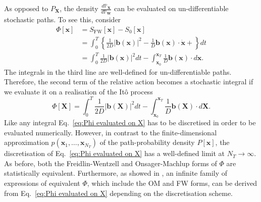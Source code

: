 As opposed to $P_\mathbf{X}$, the density $\frac{d \mathbb{P}_\mathbf{X}}{d \mathbb{P}_\mathbf{W}}$ can be evaluated on un-differentiable stochastic paths. To see this, consider
\begin{equation} \label{eq:Phi relative action}
\begin{aligned}
\Phi[\mathbf{x}] & = S_\text{FW}[\mathbf{x}] - S_0[\mathbf{x}] \\
& = \int_0^T \left\{ \frac{1}{2D} |\mathbf{b}(\mathbf{x})|^2 - \frac{1}{D} \mathbf{b}(\mathbf{x}) \cdot \dot{\mathbf{x}} +  \right\} dt \\
& = \int_0^T  \frac{1}{2D} |\mathbf{b}(\mathbf{x})|^2 dt - \int_{\mathbf{x}_0}^{\mathbf{x}_T} \frac{1}{D} \mathbf{b}(\mathbf{x}) \cdot d \mathbf{x}.
\end{aligned}
\end{equation}
The integrals in the third line are well-defined for un-differentiable paths. Therefore, the second term of the relative action becomes a stochastic integral if we evaluate it on a realisation of the It\^{o} process
\begin{equation} \label{eq:Phi evaluated on X}
\Phi[\mathbf{X}] = \int_0^T  \frac{1}{2D} |\mathbf{b}(\mathbf{X})|^2 dt - \int_{\mathbf{x}_0}^{\mathbf{x}_T} \frac{1}{D} \mathbf{b}(\mathbf{X}) \cdot d \mathbf{X}.
\end{equation}
Like any integral Eq.~\ref{eq:Phi evaluated on X} has to be discretised in order to be evaluated numerically. However, in contrast to the finite-dimensional approximation $p(\mathbf{x}_1, \dots, \mathbf{x}_{N_T})$ of the path-probability density $P[\mathbf{x}]$, the discretisation of Eq.~\ref{eq:Phi evaluated on X} has a well-defined limit at $N_T \to \infty$. As before, both the Freidlin-Wentzell and Onsager-Machlup forms of $\Phi$ are statistically equivalent. Furthermore, as showed in \citep{gladrowExperimentalMeasurementRelative2021}, an infinite family of expressions of equivalent $\Phi$, which include the OM and FW forms, can be derived from Eq.~\ref{eq:Phi evaluated on X} depending on the discretisation scheme.

